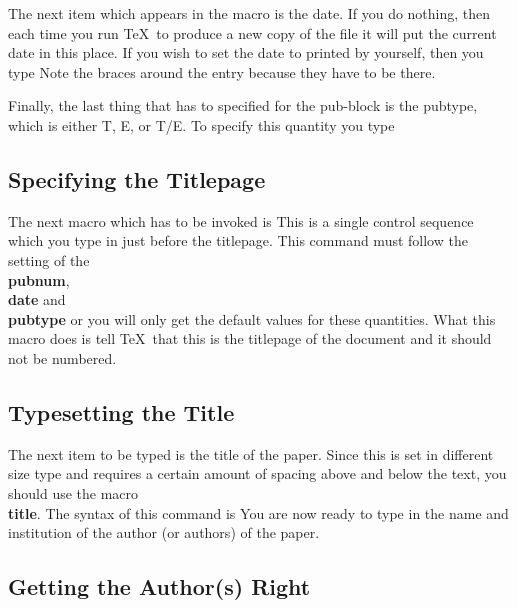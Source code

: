 The next item which appears in the macro is the date.
If you do nothing, then each time you run \TeX\ to produce a new
copy of the file it will put the current date in this place.
If you wish to set the date to printed by yourself, then you type
Note the braces around the entry because they have to be there.
 
Finally, the last thing that has to specified for the pub-block
is the pubtype, which is either T, E, or T/E.
To specify this quantity you type
 
\subsection{Specifying the Titlepage}
 
The next macro which has to be invoked is
\tc{\\titlepage}
This is a single control sequence which you type in just before the
titlepage. This command must follow the setting of the
{\bf \\pubnum}, {\bf \\date} and {\bf \\pubtype}
or you will only get the default values for these quantities.
What this macro does is tell \TeX\ that this is the titlepage of the
document and it should not be numbered.
 
 
\subsection{Typesetting the Title}
 
The next item to be typed is the title of the paper.
Since this is set in different size type and requires a certain
amount of spacing above and below the text, you should use the
macro {\bf \\title}.
The syntax of this command is
You are now ready to type in the name and institution of the author (or
authors) of the paper.
 
\subsection{Getting the Author(s) Right}
 
